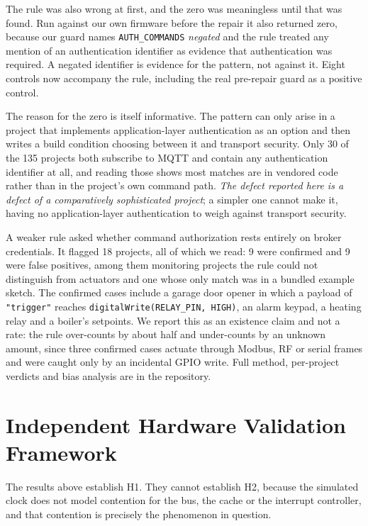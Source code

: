 The rule was also wrong at first, and the zero was meaningless until that was found. Run
against our own firmware before the repair it also returned zero, because our guard names
\texttt{AUTH\_COMMANDS} \emph{negated} and the rule treated any mention of an authentication
identifier as evidence that authentication was required. A negated identifier is evidence for
the pattern, not against it. Eight controls now accompany the rule, including the real
pre-repair guard as a positive control.

The reason for the zero is itself informative. The pattern can only arise in a project that
implements application-layer authentication as an option and then writes a build condition
choosing between it and transport security. Only 30 of the 135 projects both subscribe to MQTT
and contain any authentication identifier at all, and reading those shows most matches are in
vendored code rather than in the project's own command path. \emph{The defect reported here is
a defect of a comparatively sophisticated project}; a simpler one cannot make it, having no
application-layer authentication to weigh against transport security.

A weaker rule asked whether command authorization rests entirely on broker credentials. It
flagged 18 projects, all of which we read: 9 were confirmed and 9 were false positives, among
them monitoring projects the rule could not distinguish from actuators and one whose only match
was in a bundled example sketch. The confirmed cases include a garage door opener in which a
payload of \texttt{"trigger"} reaches \texttt{digitalWrite(RELAY\_PIN, HIGH)}, an alarm keypad,
a heating relay and a boiler's setpoints. We report this as an existence claim and not a rate:
the rule over-counts by about half and under-counts by an unknown amount, since three confirmed
cases actuate through Modbus, RF or serial frames and were caught only by an incidental GPIO
write. Full method, per-project verdicts and bias analysis are in the repository.


\section{Independent Hardware Validation Framework}\label{sec:hw}

The results above establish H1. They cannot establish H2, because the simulated clock does not
model contention for the bus, the cache or the interrupt controller, and that contention is
precisely the phenomenon in question.

